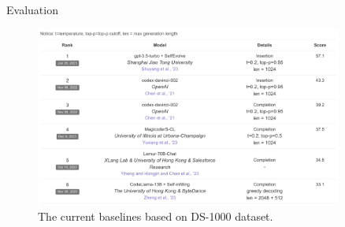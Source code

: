 \begin{frame}{Evaluation}
    \begin{figure}[!htb]
        \centering
        \includegraphics[width=0.9\textwidth]{img/ds1000_evaluation}
        \captionsetup{font=small,labelformat=empty}
        \caption{The current baselines based on DS-1000 dataset.}
    \end{figure}
\end{frame}
